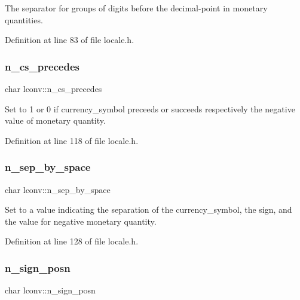 The separator for groups of digits before the decimal-\/point in monetary quantities. 



Definition at line 83 of file locale.\+h.

\mbox{\label{structlconv_ad118b68a229527f7e96538ac875169ad}} 
\subsubsection{\texorpdfstring{n\_cs\_precedes}{n\_cs\_precedes}}
{\footnotesize\ttfamily char lconv\+::n\+\_\+cs\+\_\+precedes}



Set to 1 or 0 if currency\+\_\+symbol preceeds or succeeds respectively the negative value of monetary quantity. 



Definition at line 118 of file locale.\+h.

\mbox{\label{structlconv_ab7ac20ce034900155183b32fc3c6d9a3}} 
\subsubsection{\texorpdfstring{n\_sep\_by\_space}{n\_sep\_by\_space}}
{\footnotesize\ttfamily char lconv\+::n\+\_\+sep\+\_\+by\+\_\+space}



Set to a value indicating the separation of the currency\+\_\+symbol, the sign, and the value for negative monetary quantity. 



Definition at line 128 of file locale.\+h.

\mbox{\label{structlconv_ae0bbe6f545952daef5a8cbdd054a184e}} 
\subsubsection{\texorpdfstring{n\_sign\_posn}{n\_sign\_posn}}
{\footnotesize\ttfamily char lconv\+::n\+\_\+sign\+\_\+posn}



